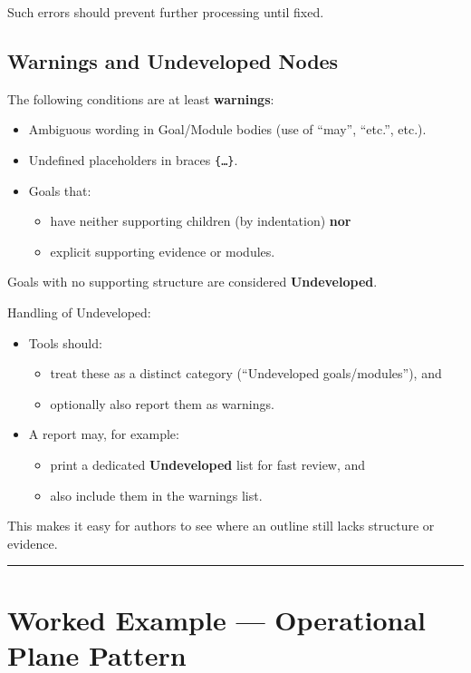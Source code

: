 \documentclass[11pt]{article}
\begin{document}
Such errors should prevent further processing until fixed.

\subsection{Warnings and Undeveloped Nodes}

The following conditions are at least \textbf{warnings}:

\begin{itemize}[leftmargin=2em]
  \item Ambiguous wording in Goal/Module bodies (use of ``may'', ``etc.'', etc.).
  \item Undefined placeholders in braces \texttt{\{\dots\}}.
  \item Goals that:
  \begin{itemize}[leftmargin=1.5em]
    \item have neither supporting children (by indentation) \textbf{nor}
    \item explicit supporting evidence or modules.
  \end{itemize}
\end{itemize}

Goals with no supporting structure are considered \textbf{Undeveloped}.

Handling of Undeveloped:

\begin{itemize}[leftmargin=2em]
  \item Tools should:
  \begin{itemize}[leftmargin=1.5em]
    \item treat these as a distinct category (``Undeveloped goals/modules''), and
    \item optionally also report them as warnings.
  \end{itemize}
  \item A report may, for example:
  \begin{itemize}[leftmargin=1.5em]
    \item print a dedicated \textbf{Undeveloped} list for fast review, and
    \item also include them in the warnings list.
  \end{itemize}
\end{itemize}

This makes it easy for authors to see where an outline still lacks structure or evidence.

\bigskip
\hrule
\bigskip

\section{Worked Example --- Operational Plane Pattern}
\end{document}
